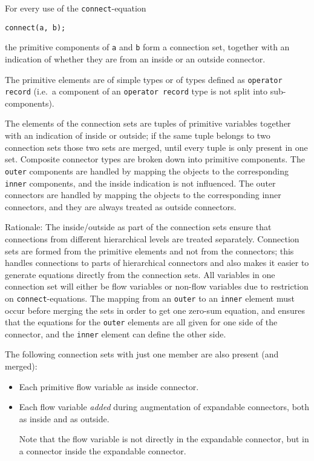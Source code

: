 For every use of the \lstinline!connect!-equation
\begin{lstlisting}[language=modelica]
connect(a, b);
\end{lstlisting}
the primitive components of \lstinline!a! and \lstinline!b! form a connection set, together with an indication of whether they are from an inside or an outside connector.
\begin{definition}\label{primitive-elements}
The primitive elements are of simple types or of types defined as \lstinline!operator record! (i.e.\ a component of an \lstinline!operator record! type is not split into sub-components).
\end{definition}
The elements of the connection sets are tuples of primitive variables together with an indication of inside or outside; if the same tuple belongs to two connection sets those two sets are merged, until every tuple is only present in one set.
Composite connector types are broken down into primitive components.
The \lstinline!outer! components are handled by mapping the objects to the corresponding \lstinline!inner! components, and the inside indication is not influenced.
The outer connectors are handled by mapping the objects to the corresponding inner connectors, and they are always treated as outside connectors.

\begin{nonnormative}
Rationale: The inside/outside as part of the connection sets ensure that connections from different hierarchical levels are treated separately.
Connection sets are formed from the primitive elements and not from the connectors; this handles connections to parts of hierarchical connectors and also makes it easier to generate equations directly from the connection sets.
All variables in one connection set will either be flow variables or non-flow variables due to restriction on \lstinline!connect!-equations.
The mapping from an \lstinline!outer! to an \lstinline!inner! element must occur before merging the sets in order to get one zero-sum equation, and ensures that the equations for the \lstinline!outer! elements are all given for one side of the connector, and the \lstinline!inner! element can define the other side.
\end{nonnormative}

The following connection sets with just one member are also present (and merged):
\begin{itemize}
\item
  Each primitive flow variable as inside connector.
\item
  Each flow variable \emph{added} during augmentation of expandable connectors, both as inside and as outside.
  \begin{nonnormative}
  Note that the flow variable is not directly in the expandable connector, but in a connector inside the expandable connector.
  \end{nonnormative}
\end{itemize}

